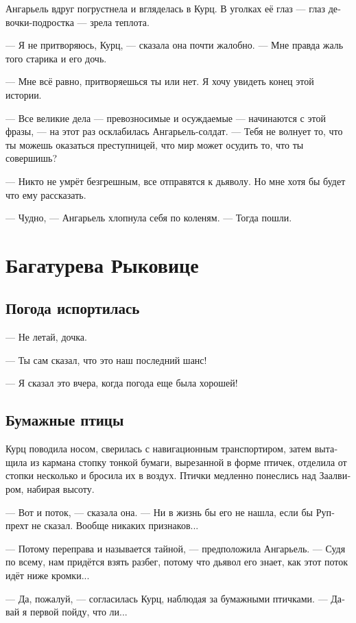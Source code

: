 \documentclass[a4paper,12pt,fleqn]{book}\usepackage{cooltooltips}\usepackage{polyglossia}\setdefaultlanguage[babelshorthands=true]{russian}\setotherlanguage{english}\defaultfontfeatures{Ligatures=TeX,Mapping=tex-text} \usepackage{xcolor}\definecolor{lightgray}{HTML}{bbbbbb}\color{lightgray}\newcommand{\ml}[3]{\textenglish{\textcolor{black}{#3}}}
\begin{document}
Ангарьель вдруг погрустнела и вгляделась в Курц.
В уголках её глаз --- глаз девочки-подростка --- зрела теплота.

--- Я не притворяюсь, Курц, --- сказала она почти жалобно.
--- Мне правда жаль того старика и его дочь.

--- Мне всё равно, притворяешься ты или нет.
Я хочу увидеть конец этой истории.

--- Все великие дела --- превозносимые и осуждаемые --- начинаются с этой фразы, --- на этот раз осклабилась Ангарьель-солдат.
--- Тебя не волнует то, что ты можешь оказаться преступницей, что мир может осудить то, что ты совершишь?

--- Никто не умрёт безгрешным, все отправятся к дьяволу.
Но мне хотя бы будет что ему рассказать.

--- Чудно, --- Ангарьель хлопнула себя по коленям.
--- Тогда пошли.

\chapter{Багатурева Рыковице}


\section{Погода испортилась}

--- Не летай, дочка.

--- Ты сам сказал, что это наш последний шанс!

--- Я сказал это вчера, когда погода еще была хорошей!

\section{Бумажные птицы}

Курц поводила носом, сверилась с навигационным транспортиром, затем вытащила из кармана стопку тонкой бумаги, вырезанной в форме птичек, отделила от стопки несколько и бросила их в воздух.
Птички медленно понеслись над Заалвиром, набирая высоту.

--- Вот и поток, --- сказала она.
--- Ни в жизнь бы его не нашла, если бы Руппрехт не сказал.
Вообще никаких признаков...

--- Потому переправа и называется тайной, --- предположила Ангарьель.
--- Судя по всему, нам придётся взять разбег, потому что дьявол его знает, как этот поток идёт ниже кромки...

--- Да, пожалуй, --- согласилась Курц, наблюдая за бумажными птичками.
--- Давай я первой пойду, что ли...
\end{document}
